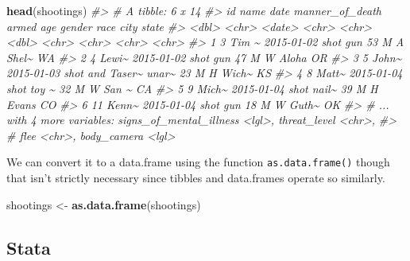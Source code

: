 \documentclass[
  12pt,
]{book}
\newenvironment{Shaded}{\begin{snugshade}}{\end{snugshade}}
\newcommand{\CommentTok}[1]{\textcolor[rgb]{0.37,0.37,0.37}{\textit{#1}}}
\newcommand{\KeywordTok}[1]{\textcolor[rgb]{0.27,0.27,0.27}{\textbf{#1}}}
\newcommand{\NormalTok}[1]{#1}
\newcommand{\StringTok}[1]{\textcolor[rgb]{0.5,0.5,0.5}{#1}}
\begin{document}
\begin{Shaded}
\begin{Highlighting}[]
\KeywordTok{head}\NormalTok{(shootings)}
\CommentTok{\#\textgreater{} \# A tibble: 6 x 14}
\CommentTok{\#\textgreater{}      id name  date       manner\_of\_death armed   age gender race  city  state}
\CommentTok{\#\textgreater{}   \textless{}dbl\textgreater{} \textless{}chr\textgreater{} \textless{}date\textgreater{}     \textless{}chr\textgreater{}           \textless{}chr\textgreater{} \textless{}dbl\textgreater{} \textless{}chr\textgreater{}  \textless{}chr\textgreater{} \textless{}chr\textgreater{} \textless{}chr\textgreater{}}
\CommentTok{\#\textgreater{} 1     3 Tim \textasciitilde{} 2015{-}01{-}02 shot            gun      53 M      A     Shel\textasciitilde{} WA   }
\CommentTok{\#\textgreater{} 2     4 Lewi\textasciitilde{} 2015{-}01{-}02 shot            gun      47 M      W     Aloha OR   }
\CommentTok{\#\textgreater{} 3     5 John\textasciitilde{} 2015{-}01{-}03 shot and Taser\textasciitilde{} unar\textasciitilde{}    23 M      H     Wich\textasciitilde{} KS   }
\CommentTok{\#\textgreater{} 4     8 Matt\textasciitilde{} 2015{-}01{-}04 shot            toy \textasciitilde{}    32 M      W     San \textasciitilde{} CA   }
\CommentTok{\#\textgreater{} 5     9 Mich\textasciitilde{} 2015{-}01{-}04 shot            nail\textasciitilde{}    39 M      H     Evans CO   }
\CommentTok{\#\textgreater{} 6    11 Kenn\textasciitilde{} 2015{-}01{-}04 shot            gun      18 M      W     Guth\textasciitilde{} OK   }
\CommentTok{\#\textgreater{} \# ... with 4 more variables: signs\_of\_mental\_illness \textless{}lgl\textgreater{}, threat\_level \textless{}chr\textgreater{},}
\CommentTok{\#\textgreater{} \#   flee \textless{}chr\textgreater{}, body\_camera \textless{}lgl\textgreater{}}
\end{Highlighting}
\end{Shaded}

We can convert it to a data.frame using the function \texttt{as.data.frame()} though that isn't strictly necessary since tibbles and data.frames operate so similarly.

\begin{Shaded}
\begin{Highlighting}[]
\NormalTok{shootings \textless{}{-}}\StringTok{ }\KeywordTok{as.data.frame}\NormalTok{(shootings)}
\end{Highlighting}
\end{Shaded}

\hypertarget{stata}{%
\subsection{Stata}\label{stata}}
\end{document}
